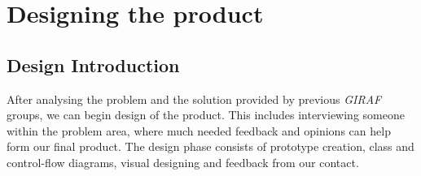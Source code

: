 \chapter{Designing the product}

\section{Design Introduction}

After analysing the problem and the solution provided by previous \textit{GIRAF} groups, we can begin design of the product.
This includes interviewing someone within the problem area, where much needed feedback and opinions can help form our final product.
The design phase consists of prototype creation, class and control-flow diagrams, visual designing and feedback from our contact.
